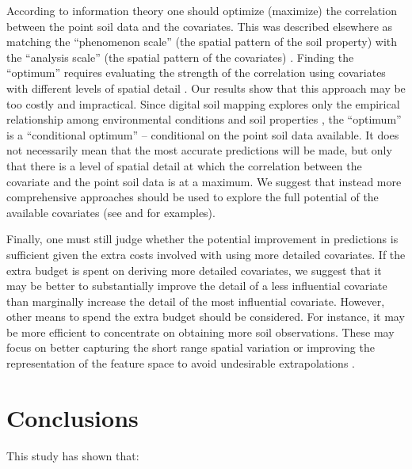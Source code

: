 According to information theory one should optimize (maximize) the correlation 
between the point soil data and the covariates. This was described elsewhere as 
matching the ``phenomenon scale'' (the spatial pattern of the soil property) 
with the ``analysis scale'' (the spatial pattern of the covariates) 
\citep{DunganEtAl2002, MillerEtAl2014}. Finding the ``optimum'' requires 
evaluating the strength of the correlation using covariates with different 
levels of spatial detail \citep{DragutEtAl2009, CavazziEtAl2013, MillerEtAl2015}.
Our results show that this approach may be too costly and impractical. Since 
digital soil mapping explores only the empirical relationship among 
environmental conditions and soil properties \citep{Grunwald2009}, the 
``optimum'' is a ``conditional optimum'' -- conditional on the point soil data 
available. It does not necessarily mean that the most accurate predictions will
be made, but only that there is a level of spatial detail at which the 
correlation between the covariate and the point soil data is at a maximum. We 
suggest that instead more comprehensive approaches should be used to explore 
the full potential of the available covariates (see \citet{BehrensEtAl2010a} and 
\citet{MillerEtAl2015} for examples).

Finally, one must still judge whether the potential improvement in predictions 
is sufficient given the extra costs involved with using more detailed covariates.
If the extra budget is spent on deriving more detailed covariates, we suggest 
that it may be better to substantially improve the detail of a less influential
covariate than marginally increase the detail of the most influential covariate.
However, other means to spend the extra budget should be considered. For 
instance, it may be more efficient to concentrate on obtaining more soil 
observations. These may focus on better capturing the short range spatial
variation \citep{BrusEtAl2007a} or improving the representation of the feature 
space to avoid undesirable extrapolations \citep{MinasnyEtAl2006b}.

\section{Conclusions}

This study has shown that:

